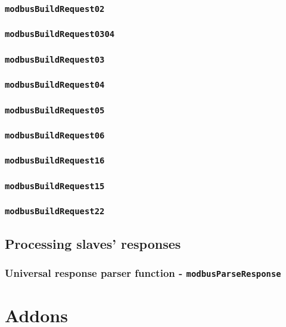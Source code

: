 \documentclass[11pt,a4paper]{article}
\begin{document}
\subsubsection{\texttt{modbusBuildRequest02}}
\subsubsection{\texttt{modbusBuildRequest0304}}
\subsubsection{\texttt{modbusBuildRequest03}}
\subsubsection{\texttt{modbusBuildRequest04}}
\subsubsection{\texttt{modbusBuildRequest05}}
\subsubsection{\texttt{modbusBuildRequest06}}
\subsubsection{\texttt{modbusBuildRequest16}}
\subsubsection{\texttt{modbusBuildRequest15}}
\subsubsection{\texttt{modbusBuildRequest22}}
\subsection{Processing slaves' responses}
\subsubsection{Universal response parser function - \texttt{modbusParseResponse}}

\section{Addons}
\end{document}
